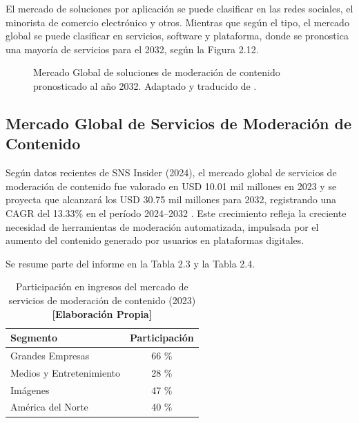 \vspace{0.5cm}

El mercado de soluciones por aplicación se puede clasificar en las redes sociales, el minorista de comercio electrónico y otros. Mientras que según el tipo, el mercado global se puede clasificar en servicios, software y plataforma, donde se pronostica una mayoría de servicios para el 2032, según la Figura 2.12.

\begin{figure}[h!]
    \centering
    \caption{Mercado Global de soluciones de moderación de contenido pronosticado al año 2032. Adaptado y traducido de \cite{bri2024solutions}.}
\end{figure}

\subsection{Mercado Global de Servicios de Moderación de Contenido}

Según datos recientes de SNS Insider (2024), el mercado global de servicios de moderación de contenido fue valorado en USD 10.01 mil millones en 2023 y se proyecta que alcanzará los USD 30.75 mil millones para 2032, registrando una CAGR del 13.33\% en el período 2024--2032 \cite{sns2024forecast}. Este crecimiento refleja la creciente necesidad de herramientas de moderación automatizada, impulsada por el aumento del contenido generado por usuarios en plataformas digitales.

Se resume parte del informe en la Tabla 2.3 y la Tabla 2.4.










\vspace{0.5cm}

\begin{table}[h!]
    \centering
    \begin{tabular}{l c}
        \hline
        \textbf{Segmento} & \textbf{Participación} \\
        \hline
        Grandes Empresas & 66 \% \\
        Medios y Entretenimiento & 28 \% \\
        Imágenes & 47 \% \\
        América del Norte & 40 \% \\
        \hline
    \end{tabular}
    \caption{Participación en ingresos del mercado de servicios de moderación de contenido (2023) \textbf{[Elaboración Propia]}}
\end{table}

